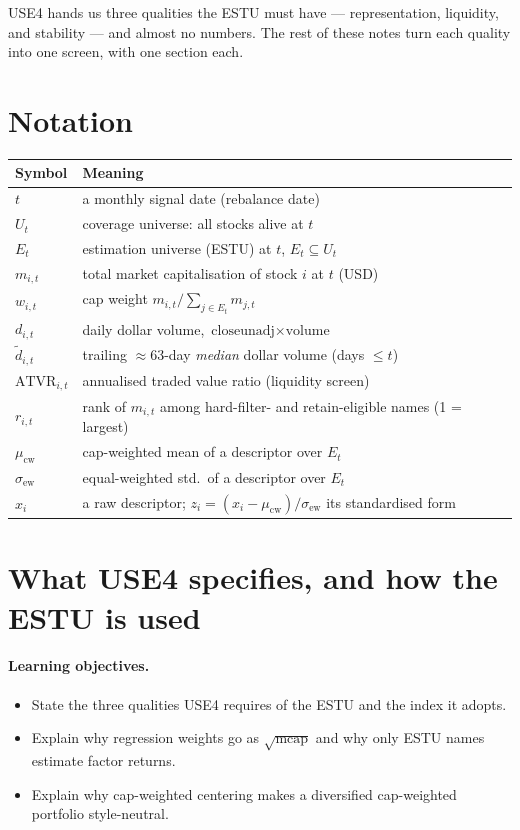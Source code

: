 \documentclass[11pt]{article}
\theoremstyle{definition}
\theoremstyle{plain}
\theoremstyle{remark}
\begin{document}
USE4 hands us three qualities the ESTU must have --- representation, liquidity, and stability --- and almost no numbers. The rest of these notes turn each quality into one screen, with one section each.

\section*{Notation}

\begin{center}
\small
\begin{tabular}{@{}ll@{}}
\toprule
Symbol & Meaning \\
\midrule
$t$ & a monthly signal date (rebalance date) \\
$U_t$ & coverage universe: all stocks alive at $t$ \\
$E_t$ & estimation universe (ESTU) at $t$, $E_t \subseteq U_t$ \\
$m_{i,t}$ & total market capitalisation of stock $i$ at $t$ (USD) \\
$w_{i,t}$ & cap weight $m_{i,t}/\sum_{j\in E_t} m_{j,t}$ \\
$d_{i,t}$ & daily dollar volume, $\text{closeunadj}\times\text{volume}$ \\
$\widetilde d_{i,t}$ & trailing $\approx$63-day \emph{median} dollar volume (days $\le t$) \\
$\text{ATVR}_{i,t}$ & annualised traded value ratio (liquidity screen) \\
$r_{i,t}$ & rank of $m_{i,t}$ among hard-filter- and retain-eligible names (1 = largest) \\
$\mu_{\text{cw}}$ & cap-weighted mean of a descriptor over $E_t$ \\
$\sigma_{\text{ew}}$ & equal-weighted std.\ of a descriptor over $E_t$ \\
$x_i$ & a raw descriptor; $z_i=(x_i-\mu_{\text{cw}})/\sigma_{\text{ew}}$ its standardised form \\
\bottomrule
\end{tabular}
\end{center}

\section{What USE4 specifies, and how the ESTU is used}\label{sec:spec}

\paragraph{Learning objectives.}
\begin{itemize}[nosep,leftmargin=1.4em]
  \item State the three qualities USE4 requires of the ESTU and the index it adopts.
  \item Explain why regression weights go as $\sqrt{\text{mcap}}$ and why only ESTU names estimate factor returns.
  \item Explain why cap-weighted centering makes a diversified cap-weighted portfolio style-neutral.
\end{itemize}
\end{document}
